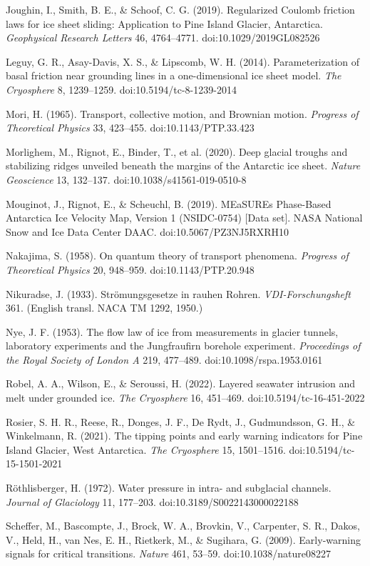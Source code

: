\documentclass[11pt]{article}
\begin{document}
Joughin, I., Smith, B. E., \& Schoof, C. G. (2019). Regularized Coulomb friction laws for ice sheet sliding: Application to Pine Island Glacier, Antarctica. \emph{Geophysical Research Letters} 46, 4764–4771. doi:10.1029/2019GL082526


Leguy, G. R., Asay-Davis, X. S., \& Lipscomb, W. H. (2014). Parameterization of basal friction near grounding lines in a one-dimensional ice sheet model. \emph{The Cryosphere} 8, 1239–1259. doi:10.5194/tc-8-1239-2014


Mori, H. (1965). Transport, collective motion, and Brownian motion. \emph{Progress of Theoretical Physics} 33, 423–455. doi:10.1143/PTP.33.423


Morlighem, M., Rignot, E., Binder, T., et al. (2020). Deep glacial troughs and stabilizing ridges unveiled beneath the margins of the Antarctic ice sheet. \emph{Nature Geoscience} 13, 132–137. doi:10.1038/s41561-019-0510-8


Mouginot, J., Rignot, E., \& Scheuchl, B. (2019). MEaSUREs Phase-Based Antarctica Ice Velocity Map, Version 1 (NSIDC-0754) [Data set]. NASA National Snow and Ice Data Center DAAC. doi:10.5067/PZ3NJ5RXRH10

Nakajima, S. (1958). On quantum theory of transport phenomena. \emph{Progress of Theoretical Physics} 20, 948–959. doi:10.1143/PTP.20.948


Nikuradse, J. (1933). Strömungsgesetze in rauhen Rohren. \emph{VDI-Forschungsheft} 361. (English transl. NACA TM 1292, 1950.)

Nye, J. F. (1953). The flow law of ice from measurements in glacier tunnels, laboratory experiments and the Jungfraufirn borehole experiment. \emph{Proceedings of the Royal Society of London A} 219, 477–489. doi:10.1098/rspa.1953.0161


Robel, A. A., Wilson, E., \& Seroussi, H. (2022). Layered seawater intrusion and melt under grounded ice. \emph{The Cryosphere} 16, 451–469. doi:10.5194/tc-16-451-2022


Rosier, S. H. R., Reese, R., Donges, J. F., De Rydt, J., Gudmundsson, G. H., \& Winkelmann, R. (2021). The tipping points and early warning indicators for Pine Island Glacier, West Antarctica. \emph{The Cryosphere} 15, 1501–1516. doi:10.5194/tc-15-1501-2021


Röthlisberger, H. (1972). Water pressure in intra- and subglacial channels. \emph{Journal of Glaciology} 11, 177–203. doi:10.3189/S0022143000022188


Scheffer, M., Bascompte, J., Brock, W. A., Brovkin, V., Carpenter, S. R., Dakos, V., Held, H., van Nes, E. H., Rietkerk, M., \& Sugihara, G. (2009). Early-warning signals for critical transitions. \emph{Nature} 461, 53–59. doi:10.1038/nature08227
\end{document}
